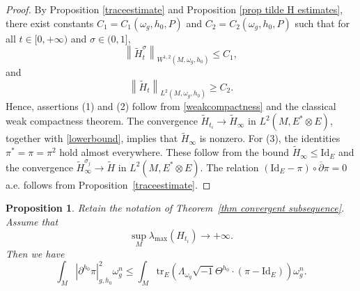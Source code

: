 \documentclass[12pt, reqno]{amsart}
\newcommand\bp{{\bar\partial}}
\theoremstyle{plain}
\newtheorem{prop}[thm]{Proposition}
\theoremstyle{definition}
\newcommand{\bproposition}{\begin{prop}}
\newcommand{\eproposition}{\end{prop}}
\newcommand{\bproof}{\begin{proof}}
\newcommand{\eproof}{\end{proof}}
\newcommand{\sq}{\sqrt{-1}}
\renewcommand{\bar}{\overline}
\newcommand{\beq}{\begin{equation}}
\newcommand{\eeq}{\end{equation}}
\renewcommand{\tilde}{\widetilde}
\renewcommand{\bp}{\bar{\partial}}
\renewcommand{\>}{\rightarrow}
\renewcommand{\>}{\rightarrow}
\renewcommand{\bp}{{\bar{\partial}}}
\newcommand{\om}{\omega}
\renewcommand{\bar}{\overline}
\renewcommand{\tilde}{\widetilde}
\newcommand{\tr}{\mathrm{tr}}
\numberwithin{equation}{section} %
\begin{document}
\bproof By Proposition \ref{traceestimate} and Proposition \ref{prop tilde H estimates},
there exist  constants $C_1=C_1(\om_g,h_0,P)$ and $C_2=C_2(\om_g,h_0,P)$ such that for all $t\in [0,+\infty)$ and $\sigma\in(0,1]$,
\beq
\left\| \tilde H_t^\sigma \right\|_{W^{1,2}(M,\omega_g, h_0)}\leq C_1, \label{weakcompactness}
\eeq
and
\beq
\left\|\tilde H_t\right\|_{L^2(M,\omega_g, h_0)}\geq C_2. \label{lowerbound}
\eeq
Hence, assertions (1) and (2) follow from \eqref{weakcompactness} and the classical weak compactness theorem. The convergence $\tilde{H}_{t_i} \rightarrow \tilde{H}_\infty$ in $L^2(M, E^* \otimes E)$, together with \eqref{lowerbound}, implies that $\tilde{H}_\infty$ is nonzero. For (3), the identities $\pi^* = \pi = \pi^2$ hold almost everywhere. These follow from the bound $\tilde{H}_\infty \leq \mathrm{Id}_E$ and the convergence $\tilde{H}_\infty^{\sigma_j} \rightarrow \tilde{H}$ in $L^2(M, E^* \otimes E)$. The relation $\left(\mathrm{Id}_E-\pi\right)\circ\bp\pi = 0$ a.e. follows from Proposition~\ref{traceestimate}.
\eproof




\bproposition \label{prop degree estimate}
Retain the notation of Theorem~\ref{thm convergent subsequence}. Assume that
\begin{equation}
\sup_M \lambda_{\max}(H_{t_i}) \to +\infty.
\end{equation}
Then we have
\begin{equation}
 \int_M \left|\partial^{h_0} \pi\right|_{g,h_0}^2 \om_g^n\leq
\int_M \tr_E\left(\Lambda_{\om_g}\sq\Theta^{h_0}\cdot\left(\pi-\mathrm{Id}_E\right)\right) \om_g^n.
\label{key deg estimate}
\end{equation}
\eproposition
\end{document}
